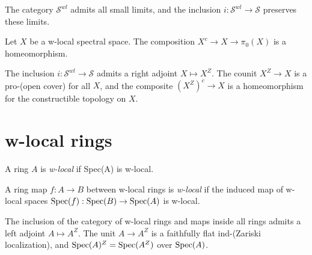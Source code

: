 \begin{lemma}
    \label{lem:w-local-space-preserves-limits}

    The category $\mathcal{S}^{wl}$ admits all small limits, and the inclusion $i : \mathcal{S}^{wl} \to \mathcal{S}$ preserves these limits.
\end{lemma}


\begin{lemma}
    \label{lem:w-local-space-connected-components}

    Let $X$ be a w-local spectral space. The composition $X^c \to X \to \pi_0(X)$ is a homeomorphism.
\end{lemma}

\begin{definition}
    \label{def:w-localization-space}
    The inclusion $i : \mathcal{S}^{wl} \to \mathcal{S}$ admits a right adjoint $X \mapsto X^Z$. The counit $X^Z \to X$ is a pro-(open cover) for all $X$, and the composite $(X^Z)^c \to X$ is a homeomorphism for the constructible topology on $X$.
\end{definition}

\section{w-local rings}

\begin{definition}
    A ring \(A\) is \emph{w-local} if Spec(A) is w-local.
    \label{def:w-local-ring}
\end{definition}

\begin{definition}
    A ring map \(f: A \to B\) between w-local rings is \emph{w-local} if the induced map of w-local spaces \(\operatorname{Spec}(f) : \operatorname{Spec}(B) \to \operatorname{Spec}(A)\) is w-local.
    \label{def:w-local-ring-map}
\end{definition}

\begin{definition}
    \label{def:w-localization-ring}
    The inclusion of the category of w-local rings and maps inside all rings admits a left adjoint $A \mapsto A^Z$. The unit $A \to A^Z$ is a faithfully flat ind-(Zariski localization), and $\operatorname{Spec}(A)^Z = \operatorname{Spec}(A^Z)$ over $\operatorname{Spec}(A)$.
\end{definition}

